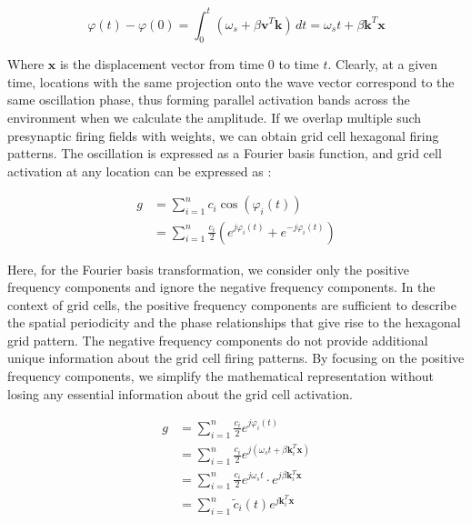 \documentclass[letterpaper]{article} %
\begin{document}
\begin{equation}
\varphi(t) - \varphi(0) = \int_{0}^{t} (\omega_{s} + \beta \boldsymbol{v}^T \boldsymbol{k}) \, dt = \omega_{s} t + \beta \boldsymbol{k}^T \boldsymbol{x}
\end{equation}

Where $\boldsymbol{x}$ is the displacement vector from time $0$ to time $t$. Clearly, at a given time, locations with the same projection onto the wave vector correspond to the same oscillation phase, thus forming parallel activation bands across the environment when we calculate the amplitude. If we overlap multiple such presynaptic firing fields with weights, we can obtain grid cell hexagonal firing patterns. The oscillation is expressed as a Fourier basis function, and grid cell activation at any location can be expressed as \cite{dang2021grid}:

\begin{equation}
\begin{aligned}
g &= \sum_{i=1}^{n} c_i \cos(\varphi_i(t)) \\
&= \sum_{i=1}^{n} \frac{c_i}{2} \left( e^{j\varphi_i(t)} + e^{-j\varphi_i(t)} \right)
\end{aligned}
\end{equation}

Here, for the Fourier basis transformation, we consider only the positive frequency components and ignore the negative frequency components. In the context of grid cells, the positive frequency components are sufficient to describe the spatial periodicity and the phase relationships that give rise to the hexagonal grid pattern. The negative frequency components do not provide additional unique information about the grid cell firing patterns. By focusing on the positive frequency components, we simplify the mathematical representation without losing any essential information about the grid cell activation.

\begin{equation}
\begin{aligned}
g &= \sum_{i=1}^{n} \frac{c_i}{2} e^{j\varphi_i(t)} \\
&= \sum_{i=1}^{n} \frac{c_i}{2} e^{j(\omega_{s} t + \beta \boldsymbol{k}_i^T \boldsymbol{x})} \\
&= \sum_{i=1}^{n} \frac{c_i}{2} e^{j\omega_{s}t} \cdot e^{j\beta \boldsymbol{k}_i^T \boldsymbol{x}} \\
&= \sum_{i=1}^{n} \tilde{c}_i(t) e^{j \boldsymbol{k}_i^T \boldsymbol{x}}
\end{aligned}
\end{equation}
\end{document}
